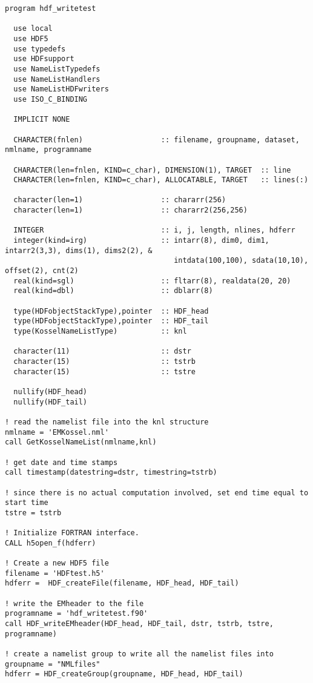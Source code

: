\documentclass[DIV=calc, paper=letter, fontsize=11pt]{scrartcl}	 %
\begin{document}
{\small\begin{verbatim}
program hdf_writetest

  use local
  use HDF5
  use typedefs
  use HDFsupport
  use NameListTypedefs
  use NameListHandlers
  use NameListHDFwriters
  use ISO_C_BINDING
  
  IMPLICIT NONE

  CHARACTER(fnlen)                  :: filename, groupname, dataset, nmlname, programname
  
  CHARACTER(len=fnlen, KIND=c_char), DIMENSION(1), TARGET  :: line 
  CHARACTER(len=fnlen, KIND=c_char), ALLOCATABLE, TARGET   :: lines(:) 

  character(len=1)                  :: chararr(256)
  character(len=1)                  :: chararr2(256,256)

  INTEGER                           :: i, j, length, nlines, hdferr
  integer(kind=irg)                 :: intarr(8), dim0, dim1, intarr2(3,3), dims(1), dims2(2), &
                                       intdata(100,100), sdata(10,10), offset(2), cnt(2)
  real(kind=sgl)                    :: fltarr(8), realdata(20, 20)
  real(kind=dbl)                    :: dblarr(8)

  type(HDFobjectStackType),pointer  :: HDF_head
  type(HDFobjectStackType),pointer  :: HDF_tail
  type(KosselNameListType)          :: knl

  character(11)                     :: dstr
  character(15)                     :: tstrb
  character(15)                     :: tstre

  nullify(HDF_head)
  nullify(HDF_tail)

! read the namelist file into the knl structure
nmlname = 'EMKossel.nml'
call GetKosselNameList(nmlname,knl)

! get date and time stamps
call timestamp(datestring=dstr, timestring=tstrb)

! since there is no actual computation involved, set end time equal to start time
tstre = tstrb

! Initialize FORTRAN interface.
CALL h5open_f(hdferr)

! Create a new HDF5 file
filename = 'HDFtest.h5'
hdferr =  HDF_createFile(filename, HDF_head, HDF_tail)

! write the EMheader to the file
programname = 'hdf_writetest.f90'
call HDF_writeEMheader(HDF_head, HDF_tail, dstr, tstrb, tstre, programname)

! create a namelist group to write all the namelist files into
groupname = "NMLfiles"
hdferr = HDF_createGroup(groupname, HDF_head, HDF_tail)


\end{verbatim}}
\end{document}
